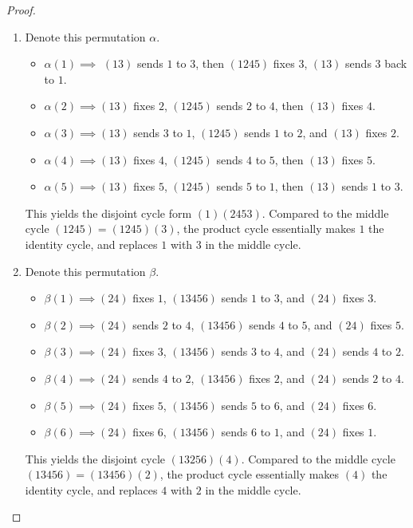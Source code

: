 \documentclass[12pt]{scrartcl}
\begin{document}
\begin{proof}
\hfill

\begin{enumerate}
  \item Denote this permutation $\alpha$. 
  \begin{itemize}
    \item $\alpha(1) \implies$ $(13)$ sends $1$ to $3$, then $(1245)$ fixes $3$, $(13)$ sends $3$ back to $1$. 
    \item $\alpha(2) \implies (13)$ fixes $2$, $(1245)$ sends $2$ to $4$, then $(13)$ fixes $4$. 
    \item $\alpha(3) \implies (13)$ sends $3$ to $1$, $(1245)$ sends $1$ to $2$, and $(13)$ fixes $2$. 
    \item $\alpha(4) \implies (13)$ fixes $4$, $(1245)$ sends $4$ to $5$, then $(13)$ fixes $5$. 
    \item $\alpha(5) \implies (13)$ fixes $5$, $(1245)$ sends $5$ to $1$, then $(13)$ sends $1$ to $3$. 
  \end{itemize}
  This yields the disjoint cycle form $(1)(2453)$. Compared to the middle cycle $(1245) = (1245)(3)$, the product cycle 
  essentially makes $1$ the identity cycle, and replaces $1$ with $3$ in the middle cycle. 
  \item Denote this permutation $\beta$. 
  \begin{itemize}
    \item $\beta(1) \implies (24)$ fixes $1$, $(13456)$ sends $1$ to $3$, and $(24)$ fixes $3$. 
    \item $\beta(2) \implies (24)$ sends $2$ to $4$, $(13456)$ sends $4$ to $5$, and $(24)$ fixes $5$.  
    \item $\beta(3) \implies (24)$ fixes $3$, $(13456)$ sends $3$ to $4$, and $(24)$ sends $4$ to $2$. 
    \item $\beta(4) \implies (24)$ sends $4$ to $2$, $(13456)$ fixes $2$, and $(24)$ sends $2$ to $4$. 
    \item $\beta(5) \implies (24)$ fixes $5$, $(13456)$ sends $5$ to $6$, and $(24)$ fixes $6$. 
    \item $\beta(6) \implies (24)$ fixes $6$, $(13456)$ sends $6$ to $1$, and $(24)$ fixes $1$. 
  \end{itemize}
  This yields the disjoint cycle $(13256)(4)$. Compared to the middle cycle $(13456) = (13456)(2)$, the product cycle 
  essentially makes $(4)$ the identity cycle, and replaces $4$ with $2$ in the middle cycle. 
\end{enumerate}

\end{proof}
\newpage
\end{document}
